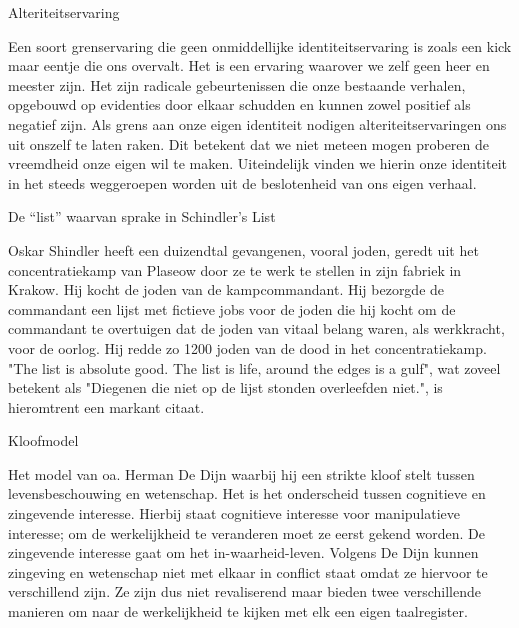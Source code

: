 \documentclass[main.tex]{subfiles}
\begin{document}
\begin{examenvraag}
    \begin{vraag}
        Alteriteitservaring
    \end{vraag}

    \begin{antwoord}
	Een soort grenservaring die geen onmiddellijke identiteitservaring is zoals een kick maar 
	eentje die ons overvalt.‭ ‬Het is een ervaring waarover we zelf geen heer en meester zijn.‭ ‬Het 
	zijn radicale gebeurtenissen die onze bestaande verhalen,‭ ‬opgebouwd op evidenties door elkaar 
	schudden en kunnen zowel positief als negatief zijn.‭ ‬Als grens aan onze eigen identiteit 
	nodigen alteriteitservaringen ons uit onszelf te laten raken.‭ ‬Dit betekent dat we niet meteen 
	mogen proberen de vreemdheid onze eigen wil te maken.‭ ‬Uiteindelijk vinden we hierin onze 
	identiteit in het steeds weggeroepen worden uit de beslotenheid van ons eigen verhaal.
    \end{antwoord}
\end{examenvraag}


\begin{examenvraag}
    \begin{vraag}
        De “list” waarvan sprake in Schindler’s List
    \end{vraag}

    \begin{antwoord}
        Oskar Shindler heeft een duizendtal gevangenen, vooral joden, geredt uit het concentratiekamp van Plaseow door ze te werk te stellen in zijn fabriek in Krakow.
        Hij kocht de joden van de kampcommandant.
        Hij bezorgde de commandant een lijst met fictieve jobs voor de joden die hij kocht om de commandant te overtuigen dat de joden van vitaal belang waren, als werkkracht, voor de oorlog.
        Hij redde zo 1200 joden van de dood in het concentratiekamp.
        "The list is absolute good. The list is life, around the edges is a gulf", wat zoveel betekent als "Diegenen die niet op de lijst stonden overleefden niet.", is hieromtrent een markant citaat.
    \end{antwoord}
\end{examenvraag}


\begin{examenvraag}
    \begin{vraag}
        Kloofmodel
    \end{vraag}

    \begin{antwoord}
	Het model van oa.‭ ‬Herman De Dijn‭ ‬waarbij hij een strikte kloof stelt tussen levensbeschouwing 
	en wetenschap.‭ ‬Het is het onderscheid tussen cognitieve en zingevende interesse.‭ ‬Hierbij staat 
	cognitieve interesse voor manipulatieve interesse‭; ‬om de werkelijkheid te veranderen moet ze 
	eerst‭ ‬gekend worden.‭ ‬De zingevende interesse gaat om het in-waarheid-leven.‭ ‬Volgens De Dijn 
	kunnen zingeving en wetenschap niet met elkaar in conflict staat omdat ze hiervoor te 
	verschillend zijn.‭ ‬Ze zijn dus niet revaliserend maar bieden twee verschillende manieren om 
	naar de werkelijkheid te kijken met elk een eigen taalregister.
    \end{antwoord}
\end{examenvraag}
\end{document}
